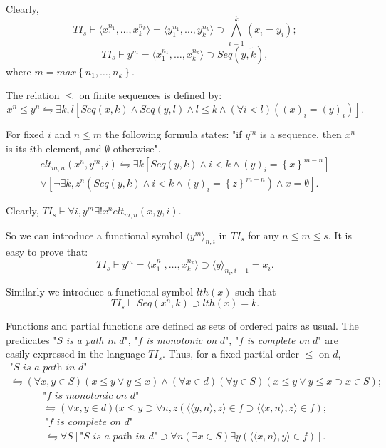 \documentclass{asl}
\theoremstyle{definition}
\begin{document}
Clearly,
\[TI_s\vdash \langle x_1^{n_1},\ldots,x_k^{n_k}\rangle= \langle y_1^{n_1},\ldots,y_k^{n_k}\rangle \supset \bigwedge_{i=1}^k(x_i=y_i);\]
\[TI_s\vdash y^m=\langle x_1^{n_1},\ldots,x_k^{n_k}\rangle \supset Seq(y,\tilde{k}),\]
where $m=max\left\lbrace n_1,\ldots,n_k\right\rbrace$. 

The relation $\leqslant$ on finite sequences is defined by:
\[x^n\leqslant y^n\leftrightharpoons \exists k,l \left[Seq(x,k) \wedge Seq(y,l) \wedge l\leqslant k \wedge(\forall i<l)\left((x)_i=(y)_i \right)\right].\]

For fixed $i$ and $n\leqslant m$ the following formula states: "if $y^m$ is a sequence, then $x^n$ is its $i$th element, and $\emptyset$ otherwise".
\begin{multline*}
elt_{m,n}(x^n,y^m,i) \leftrightharpoons \exists k \left[Seq(y,k)\wedge i< k\wedge (y)_i=\left\lbrace x \right\rbrace ^{m-n}\right]
\\
\vee \left[\neg \exists k,z^n \left(Seq(y,k)\wedge i< k\wedge (y)_i=\left\lbrace z \right\rbrace ^{m-n}\right)\wedge x=\emptyset\right].
\end{multline*}

Clearly, $TI_s \vdash \forall i, y^m\exists ! x^n elt_{m,n}(x,y,i)$.

So we can introduce a functional symbol $\langle y^m\rangle_{n,i}$ in $TI_s$ for any $n\leqslant m\leqslant s$. It is easy to prove that:
\[TI_s \vdash y^m=\langle x_1^{n_1},\ldots,x_k^{n_k}\rangle \supset \langle y\rangle_{n_i,i-1}=x_i.\]

Similarly we introduce a functional symbol $lth(x)$ such that 
\[TI_s \vdash Seq(x^n,k) \supset lth(x)=k.\]

Functions and partial functions are defined as sets of ordered pairs as usual. The predicates "$S$ \textit{is a path in} $d$", "$f$ \textit{is monotonic on} $d$", "$f$ \textit{is complete on} $d$" are easily expressed in the language $TI_s$. Thus, for a fixed partial order $\leqslant$ on $d$,
\begin{multline*}
\text{"}S\textit{ is a path in }d\text{"} 
\\
\leftrightharpoons (\forall x,y\in S)(x\leqslant y \vee y\leqslant x) 
\wedge (\forall x\in d)(\forall y\in S)(x \leqslant y \vee y \leqslant x \supset x\in S);
\end{multline*}
\begin{multline*}
\text{"}f\textit{ is monotonic on }d\text{"} 
\\
\leftrightharpoons (\forall x,y\in d)(x\leqslant y 
\supset\forall n,z\left(\langle\langle y,n\rangle,z\rangle \in f \supset \langle\langle x,n\rangle,z\rangle \in f \right);
\end{multline*}
\begin{multline*}
\text{"}f\textit{ is complete on }d\text{"} 
\\
\leftrightharpoons\forall S \left[\text{"}S\textit{ is a path in }d\text{"} \supset 
\forall n (\exists x\in S)\exists y \left(\langle\langle x,n\rangle,y\rangle \in f \right)\right]. 
\end{multline*}
\end{document}
